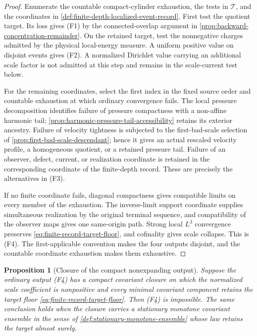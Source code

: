 \documentclass[11pt]{amsart}
\numberwithin{equation}{section}
\theoremstyle{plain}
\newtheorem{proposition}[proposition]{Proposition}
\theoremstyle{definition}
\theoremstyle{remark}
\begin{document}
\begin{proof}
Enumerate the countable compact-cylinder exhaustion, the tests in
\(\mathscr T\), and the coordinates in
\cref{def:finite-depth-localized-event-record}.  First test the quotient
target.  Its loss gives \textup{(F1)} by the connected-overlap argument in
\cref{prop:backward-concentration-remainder}.  On the retained target, test
the nonnegative charges admitted by the physical local-energy measure.  A
uniform positive value on disjoint events gives \textup{(F2)}.  A normalized
Dirichlet value carrying an additional scale factor is not admitted at this
step and remains in the scale-current test below.

For the remaining coordinates, select the first index in the fixed source
order and countable exhaustion at which ordinary convergence fails.  The
local pressure decomposition identifies failure of pressure compactness with
a non-affine harmonic tail; \cref{prop:harmonic-pressure-tail-accessibility}
retains its exterior ancestry.  Failure of velocity tightness is subjected to
the first-bad-scale selection of
\cref{prop:first-bad-scale-descendant}; hence it gives an actual rescaled
velocity profile, a homogeneous quotient, or a retained pressure tail.
Failure of an observer, defect, current, or realization coordinate is retained
in the corresponding coordinate of the finite-depth record.  These are
precisely the alternatives in \textup{(F3)}.

If no finite coordinate fails, diagonal compactness gives compatible limits
on every member of the exhaustion.  The inverse-limit support coordinate
supplies simultaneous realization by the original terminal sequence, and
compatibility of the observer maps gives one same-origin path.  Strong local
\(L^3\) convergence preserves \eqref{eq:finite-record-target-floor}, and
cofinality gives scale collapse.  This is \textup{(F4)}.  The first-applicable
convention makes the four outputs disjoint, and the countable coordinate
exhaustion makes them exhaustive.
\end{proof}

\begin{proposition}[Closure of the compact nonexpanding output]
\label{prop:compact-nonexpanding-output-closure}
Suppose the ordinary output \textup{(F4)} has a compact covariant closure on
which the normalized scale coefficient is nonpositive and every minimal
covariant component retains the target floor
\eqref{eq:finite-record-target-floor}.  Then \textup{(F4)} is impossible.
The same conclusion holds when the closure carries a stationary monotone
covariant ensemble in the sense of
\cref{def:stationary-monotone-ensemble} whose law retains the target almost
surely.
\end{proposition}
\end{document}
